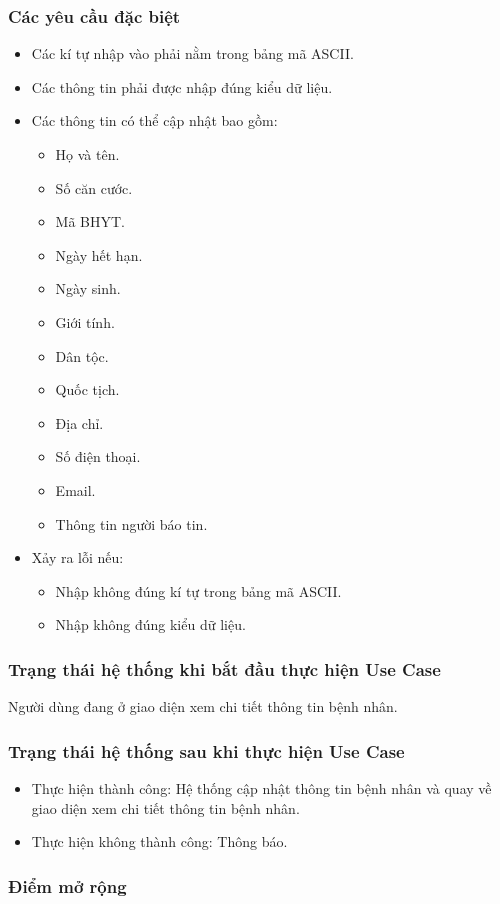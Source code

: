 \subsubsection{Các yêu cầu đặc biệt}
\begin{itemize}
  \item Các kí tự nhập vào phải nằm trong bảng mã ASCII.
  \item Các thông tin phải được nhập đúng kiểu dữ liệu.
  \item Các thông tin có thể cập nhật bao gồm:
    \begin{itemize}
      \item Họ và tên.
      \item Số căn cước.
      \item Mã BHYT.
      \item Ngày hết hạn.
      \item Ngày sinh.
      \item Giới tính.
      \item Dân tộc.
      \item Quốc tịch.
      \item Địa chỉ.
      \item Số điện thoại.
      \item Email.
      \item Thông tin người báo tin.
    \end{itemize}
  \item Xảy ra lỗi nếu:
    \begin{itemize}
      \item Nhập không đúng kí tự trong bảng mã ASCII.
      \item Nhập không đúng kiểu dữ liệu.
    \end{itemize}
\end{itemize}

\subsubsection{Trạng thái hệ thống khi bắt đầu thực hiện Use Case}
Người dùng đang ở giao diện xem chi tiết thông tin bệnh nhân.

\subsubsection{Trạng thái hệ thống sau khi thực hiện Use Case}
\begin{itemize}
  \item Thực hiện thành công: Hệ thống cập nhật thông tin bệnh nhân và quay về giao diện xem chi tiết thông tin bệnh nhân.
  \item Thực hiện không thành công: Thông báo.
\end{itemize}

\subsubsection{Điểm mở rộng}